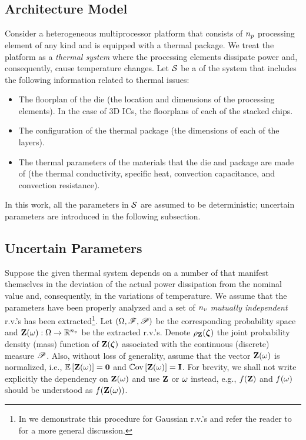 \subsection{Architecture Model} 
Consider a heterogeneous multiprocessor platform that consists of ${n_p}$ processing element of any kind and is equipped with a thermal package. We treat the platform as a \emph{thermal system} where the processing elements dissipate power and, consequently, cause temperature changes. Let $\mathcal{S}$ be a  of the system that includes the following information related to thermal issues:
\begin{itemize}
  \item The floorplan of the die (the location and dimensions of the processing elements). In the case of 3D ICs, the floorplans of each of the stacked chips.
  \item The configuration of the thermal package (the dimensions of each of the layers).
  \item The thermal parameters of the materials that the die and package are made of (the thermal conductivity, specific heat, convection capacitance, and convection resistance).
\end{itemize}

In this work, all the parameters in $\mathcal{S}$ are assumed to be deterministic; uncertain parameters are introduced in the following subsection.

\subsection{Uncertain Parameters} 
Suppose the given thermal system depends on a number of  that manifest themselves in the deviation of the actual power dissipation from the nominal value and, consequently, in the variations of temperature. We assume that the parameters have been properly analyzed and a set of ${n_v}$ \emph{mutually independent} r.v.'s has been extracted\footnote{In  we demonstrate this procedure for Gaussian r.v.'s and refer the reader to \cite{xiu2010} for a more general discussion.}. Let $(\Omega, \mathscr{F}, \mathscr{P})$ be the corresponding probability space and $\mathbf{Z}(\omega): \Omega \to \mathbb{R}^{n_v}$ be the extracted r.v.'s. Denote $\rho_{\mathbf{Z}}(\boldsymbol{\zeta})$ the joint probability density (mass) function of $\mathbf{Z}(\boldsymbol{\zeta})$ associated with the continuous (discrete) measure $\mathscr{P}$. Also, without loss of generality, assume that the vector $\mathbf{Z}(\omega)$ is normalized, i.e., $\oExp{\vZ(\o)} = \mZero$ and $\oCov{\vZ(\o)} = \mI$. For brevity, we shall not write explicitly the dependency on $\mathbf{Z}(\omega)$ and use $\mathbf{Z}$ or $\omega$ instead, e.g., $f(\mathbf{Z})$ and $f(\omega)$ should be understood as $f(\mathbf{Z}(\omega))$.


